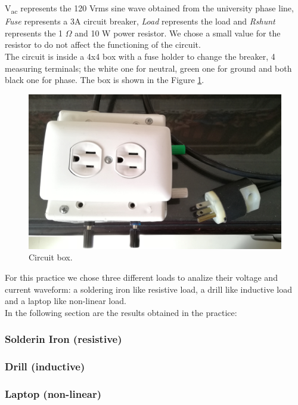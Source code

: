 \documentclass[journal]{IEEEtran}
\begin{document}
V\textsubscript{ac} represents the 120 Vrms sine wave obtained from 
the university phase line, \textit{Fuse} represents a 3A circuit 
breaker, \textit{Load} represents the load and \textit{Rshunt} 
represents the 1 $\Omega$ and 10 W 
power resistor. We chose a small value for the resistor to do not 
affect the functioning of the circuit. \\

The circuit is inside a 4x4 box with a fuse holder to change the 
breaker, 4 measuring terminals; the white one for neutral, green one 
for ground and  both black one for phase. The box is shown in the 
Figure \ref{circuit_box}. \\

\begin{figure}[h]
\centering
\includegraphics[clip,width=0.8\columnwidth]{circuit_box.png}
\caption{Circuit box.}
\label{circuit_box}
\end{figure}

For this practice we chose three different loads to analize their 
voltage and current waveform: a soldering iron 
like resistive load, a drill like inductive load and a laptop 
like non-linear load. \\

In the following section are the results obtained in the practice: \\

\subsubsection{Solderin Iron (resistive)}


\subsubsection{Drill (inductive)}


\subsubsection{Laptop (non-linear)}
\end{document}
